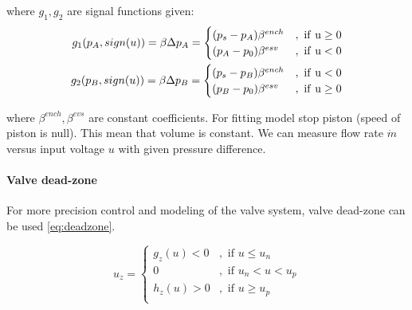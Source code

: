 where $g_1, g_2$ are signal functions given:
\begin{equation}
    \begin{aligned}
        g_1(p_A, sign(u)) = \beta \Delta p_A = 
        \begin{cases}
            (p_s - p_A) \beta^{ench} &, \rm \ if\  u \ge 0 \\
            (p_A - p_0) \beta^{esv} &, \rm \ if\  u  < 0 \\
        \end{cases} \\
        g_2(p_B, sign(u)) = \beta \Delta p_B = 
        \begin{cases}
            (p_s - p_B) \beta^{ench} &, \rm \ if\  u < 0 \\
            (p_B - p_0) \beta^{esv} &, \rm \ if\  u \ge 0 \\
        \end{cases}
    \end{aligned}
    \label{eq:valve_3}
\end{equation}

where $\beta^{ench}, \beta^{evs}$ are constant coefficients.
For fitting model stop piston (speed of piston is null). This mean that
volume is constant. We can measure flow rate $\dot{m}$ versus input voltage
$u$ with given pressure difference.

\paragraph{Valve dead-zone}
For more precision control and modeling of the valve system, valve
dead-zone can be used \ref{eq:deadzone}.

\begin{equation}
    u_z = 
    \begin{cases}
        g_z(u) < 0 &, \text{ if } u \le u_n \\
        0          &, \text{ if } u_n < u < u_p \\
        h_z(u) > 0 &, \text{ if } u \ge u_p \\
    \end{cases}  
    \label{eq:deadzone}
\end{equation}



